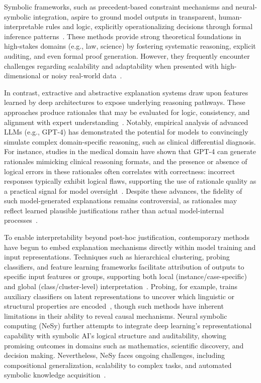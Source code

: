 \documentclass[sigconf]{acmart}
\begin{document}
Symbolic frameworks, such as precedent-based constraint mechanisms and neural-symbolic integration, aspire to ground model outputs in transparent, human-interpretable rules and logic, explicitly operationalizing decisions through formal inference patterns~\cite{ref14, ref18, ref19, ref45, ref73}. These methods provide strong theoretical foundations in high-stakes domains (e.g., law, science) by fostering systematic reasoning, explicit auditing, and even formal proof generation. However, they frequently encounter challenges regarding scalability and adaptability when presented with high-dimensional or noisy real-world data~\cite{ref14, ref18, ref41, ref46, ref83}.

In contrast, extractive and abstractive explanation systems draw upon features learned by deep architectures to expose underlying reasoning pathways. These approaches produce rationales that may be evaluated for logic, consistency, and alignment with expert understanding~\cite{ref1, ref3, ref10, ref35, ref41, ref45, ref49, ref85}. Notably, empirical analysis of advanced LLMs (e.g., GPT-4) has demonstrated the potential for models to convincingly simulate complex domain-specific reasoning, such as clinical differential diagnosis. For instance, studies in the medical domain have shown that GPT-4 can generate rationales mimicking clinical reasoning formats, and the presence or absence of logical errors in these rationales often correlates with correctness: incorrect responses typically exhibit logical flaws, supporting the use of rationale quality as a practical signal for model oversight~\cite{ref1, ref10}. Despite these advances, the fidelity of such model-generated explanations remains controversial, as rationales may reflect learned plausible justifications rather than actual model-internal processes~\cite{ref3, ref43, ref84}.

To enable interpretability beyond post-hoc justification, contemporary methods have begun to embed explanation mechanisms directly within model training and input representations. Techniques such as hierarchical clustering, probing classifiers, and feature learning frameworks facilitate attribution of outputs to specific input features or groups, supporting both local (instance/case-specific) and global (class/cluster-level) interpretation~\cite{ref14, ref36, ref52, ref83}. Probing, for example, trains auxiliary classifiers on latent representations to uncover which linguistic or structural properties are encoded~\cite{ref14}, though such methods have inherent limitations in their ability to reveal causal mechanisms. Neural symbolic computing (NeSy) further attempts to integrate deep learning’s representational capability with symbolic AI’s logical structure and auditability, showing promising outcomes in domains such as mathematics, scientific discovery, and decision making. Nevertheless, NeSy faces ongoing challenges, including compositional generalization, scalability to complex tasks, and automated symbolic knowledge acquisition~\cite{ref19, ref35, ref49, ref73, ref84}.
\end{document}

